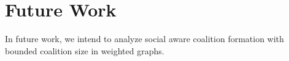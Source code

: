 \documentclass[sigconf]{aamas}
\begin{document}
\section{Future Work}
In future work, we intend to analyze social aware coalition formation with bounded coalition size in weighted graphs.


\end{document}
